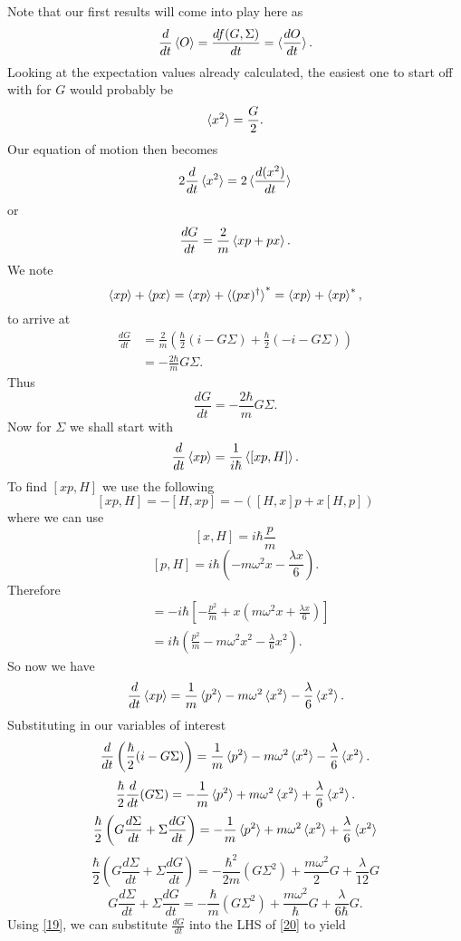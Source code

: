 \documentclass[11pt,letterpaper]{article}
\begin{document}
\begin{enumerate}
\begin{enumerate}
Note that our first results will come into play here as
$$\frac{d}{dt}\braket{O}=\frac{df(G,\Sigma)}{dt} = \braket{\frac{dO}{dt}}.$$
Looking at the expectation values already calculated, the easiest one to start off with for $G$ would probably be 
$$\braket{x^2} = \frac{G}{2}.$$
Our equation of motion then becomes
$$2\frac{d}{dt}\braket{x^2}= 2\braket{\frac{d(x^2)}{dt}}$$
or
$$\frac{dG}{dt} = \frac{2}{m}\braket{xp+px}.$$
We note
$$\braket{xp} +\braket{px} = \braket{xp}+\braket{(px)^\dag}^* = \braket{xp}+\braket{xp}^*,$$
to arrive at
\begin{align*}\frac{dG}{dt} &= \frac{2}{m}\left(\frac{\hbar}{2}(i-G\Sigma)+\frac{\hbar}{2}(-i-G\Sigma)\right)\\
&= -\frac{2\hbar}{m}G\Sigma.
\end{align*}
Thus
\begin{equation}\label{19}\frac{dG}{dt} = -\frac{2\hbar}{m}G\Sigma.\end{equation}
Now for $\Sigma$ we shall start with 
$$\frac{d}{dt}\braket{xp} = \frac{1}{i\hbar}\braket{[xp,H]}.$$
To find $[xp,H]$ we use the following
$$[xp,H] = -[H,xp] = -([H,x]p+x[H,p])$$
where we can use
$$[x,H] = i\hbar\frac{p}{m}$$
$$[p,H] = i\hbar\left(-m\omega^2x-\frac{\lambda x}{6}\right).$$
Therefore
\begin{align*}[xp,H] &= -i\hbar\left[-\frac{p^2}{m}+x\left(m\omega^2x+\frac{\lambda x}{6}\right)\right]\\
&=i\hbar\left(\frac{p^2}{m}-m\omega^2x^2-\frac{\lambda}{6}x^2\right).
\end{align*}
So now we have
$$\frac{d}{dt}\braket{xp} = \frac{1}{m}\braket{p^2}-m\omega^2\braket{x^2}-\frac{\lambda}{6}\braket{x^2}.$$
Substituting in our variables of interest
$$\frac{d}{dt}\left(\frac{\hbar}{2}(i-G\Sigma)\right) =  \frac{1}{m}\braket{p^2}-m\omega^2\braket{x^2}-\frac{\lambda}{6}\braket{x^2}.$$
$$\frac{\hbar}{2}\frac{d}{dt}(G\Sigma) =  -\frac{1}{m}\braket{p^2}+m\omega^2\braket{x^2}+\frac{\lambda}{6}\braket{x^2}.$$
$$\frac{\hbar}{2}\left(G\frac{d\Sigma}{dt}+\Sigma\frac{dG}{dt}\right) =  -\frac{1}{m}\braket{p^2}+m\omega^2\braket{x^2}+\frac{\lambda}{6}\braket{x^2}$$
$$\frac{\hbar}{2}\left(G\frac{d\Sigma}{dt}+\Sigma\frac{dG}{dt}\right) =-\frac{\hbar^2}{2m}(G\Sigma^2)+\frac{m\omega^2}{2}G+\frac{\lambda}{12}G$$
\begin{equation}\label{20}G\frac{d\Sigma}{dt}+\Sigma\frac{dG}{dt} =-\frac{\hbar}{m}(G\Sigma^2)+\frac{m\omega^2}{\hbar}G+\frac{\lambda}{6\hbar}G.\end{equation}
Using \eqref{19}, we can substitute $\frac{dG}{dt}$ into the LHS of \eqref{20} to yield

\end{enumerate}
\end{enumerate}
\end{document}
